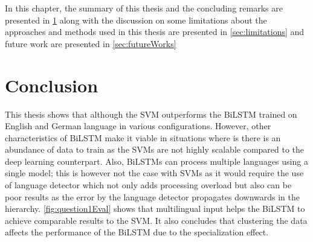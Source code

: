 \label{ch:conclusion}

In this chapter, the summary of this  thesis and the concluding remarks are presented in \ref{sec:conclusion} along with the discussion on some limitations about the approaches and methods used in this thesis are presented in \ref{sec:limitations} and future work are presented in \ref{sec:futureWorks}

\section{Conclusion}\label{sec:conclusion}
This thesis shows that although the \gls{SVM} outperforms the \gls{BiLSTM} trained on English and German language in various configurations. However, other characteristics of \gls{BiLSTM} make it viable in situations where is there is an abundance of data to train as the \glspl{SVM} are not highly scalable compared to the deep learning counterpart. Also, \glspl{BiLSTM} can process multiple languages using a single model; this is however not the case with \glspl{SVM} as it would require the use of language detector which not only adds processing overload but also can be poor results as the error by the language detector propagates downwards in the hierarchy.  \ref{fig:question1Eval} shows that multilingual input helps the \gls{BiLSTM} to achieve comparable results to the SVM. It also concludes that clustering the data affects the performance of the \gls{BiLSTM} due to the specialization effect. 

